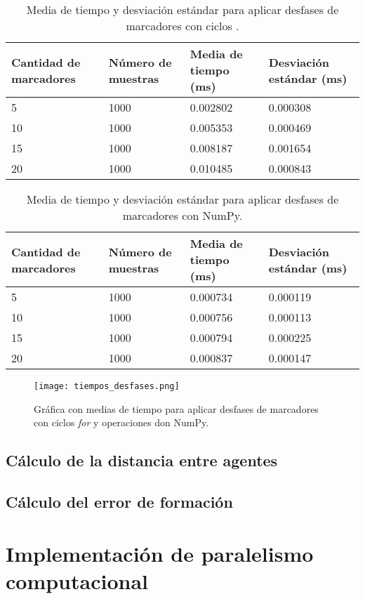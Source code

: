 \begin{table}[H]
	\centering
	\resizebox{\textwidth}{!} {
	\begin{tabular}{|l|l|l|l|}
		\hline
		\textbf{Cantidad de marcadores} & \textbf{Número de muestras} & \textbf{Media de tiempo (ms)} & \textbf{Desviación estándar (ms)} \\ \hline
		5 & 1000 & 0.002802 & 0.000308 \\ \hline
		10 & 1000 & 0.005353 & 0.000469 \\ \hline
		15 & 1000 & 0.008187 & 0.001654 \\ \hline
		20 & 1000 & 0.010485 & 0.000843 \\ \hline
	\end{tabular}}
	\caption{Media de tiempo y desviación estándar para aplicar desfases de marcadores con ciclos .}
	\label{cuadro:tiempos_desfases_for}
\end{table}

\begin{table}[H]
	\centering
	\resizebox{\textwidth}{!} {
	\begin{tabular}{|l|l|l|l|}
		\hline
		\textbf{Cantidad de marcadores} & \textbf{Número de muestras} & \textbf{Media de tiempo (ms)} & \textbf{Desviación estándar (ms)} \\ \hline
		5 & 1000 & 0.000734 & 0.000119 \\ \hline
		10 & 1000 & 0.000756 & 0.000113 \\ \hline
		15 & 1000 & 0.000794 & 0.000225 \\ \hline
		20 & 1000 & 0.000837 & 0.000147 \\ \hline
	\end{tabular}}
	\caption{Media de tiempo y desviación estándar para aplicar desfases de marcadores con NumPy.}
	\label{cuadro:tiempos_desfases_numpy}
\end{table}

\begin{figure}[H]
	\centering
	\texttt{[image: tiempos\_desfases.png]}
	\caption{Gráfica con medias de tiempo para aplicar desfases de marcadores con ciclos \textit{for} y operaciones don NumPy.}
	\label{fig:grafica_tiempos_desfases}
\end{figure}

\subsection{Cálculo de la distancia entre agentes}
\subsection{Cálculo del error de formación}

\section{Implementación de paralelismo computacional}





